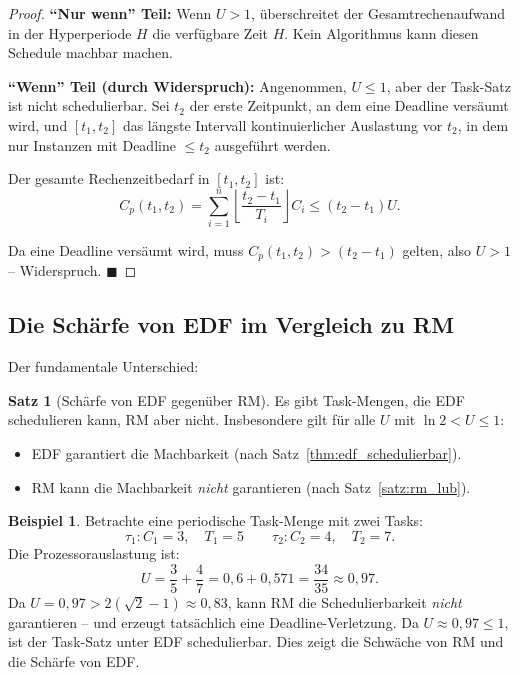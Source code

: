 ﻿\documentclass[a4paper,12pt]{report}
\theoremstyle{definition}
\newtheorem{beispiel}{Beispiel}[chapter]
\newtheorem{satz}{Satz}[chapter]
\begin{document}
\begin{proof}
	\textbf{``Nur wenn'' Teil:} Wenn $U > 1$, überschreitet der Gesamtrechenaufwand
	in der Hyperperiode $H$ die verfügbare Zeit $H$. Kein Algorithmus kann diesen
	Schedule machbar machen.

	\textbf{``Wenn'' Teil (durch Widerspruch):} Angenommen, $U \leq 1$, aber der
	Task-Satz ist nicht schedulierbar. Sei $t_2$ der erste Zeitpunkt, an dem eine
	Deadline versäumt wird, und $[t_1, t_2]$ das längste Intervall kontinuierlicher
	Auslastung vor $t_2$, in dem nur Instanzen mit Deadline $\leq t_2$ ausgeführt werden.

	Der gesamte Rechenzeitbedarf in $[t_1, t_2]$ ist:
	\[
		C_p(t_1, t_2) = \sum_{i=1}^{n} \left\lfloor \frac{t_2 - t_1}{T_i} \right\rfloor C_i \leq (t_2 - t_1) U.
	\]

	Da eine Deadline versäumt wird, muss $C_p(t_1, t_2) > (t_2 - t_1)$ gelten,
	also $U > 1$ -- Widerspruch. \hfill$\blacksquare$
\end{proof}

\subsection{Die Schärfe von EDF im Vergleich zu RM}

Der fundamentale Unterschied:

\begin{satz}[Schärfe von EDF gegenüber RM]
	\label{satz:edf_scharf}
	Es gibt Task-Mengen, die EDF schedulieren kann, RM aber nicht. Insbesondere gilt
	für alle $U$ mit $\ln 2 < U \leq 1$:
	\begin{itemize}
		\item EDF garantiert die Machbarkeit (nach Satz~\ref{thm:edf_schedulierbar}).
		\item RM kann die Machbarkeit \emph{nicht} garantieren (nach Satz~\ref{satz:rm_lub}).
	\end{itemize}
\end{satz}

\begin{beispiel}
	Betrachte eine periodische Task-Menge mit zwei Tasks:
	\[
		\tau_1: C_1 = 3, \quad T_1 = 5 \qquad \tau_2: C_2 = 4, \quad T_2 = 7.
	\]
	Die Prozessorauslastung ist:
	\[
		U = \frac{3}{5} + \frac{4}{7} = 0{,}6 + 0{,}571 = \frac{34}{35} \approx 0{,}97.
	\]
	Da $U = 0{,}97 > 2(\sqrt{2}-1) \approx 0{,}83$, kann RM die Schedulierbarkeit
	\emph{nicht} garantieren -- und erzeugt tatsächlich eine Deadline-Verletzung.
	Da $U \approx 0{,}97 \leq 1$, ist der Task-Satz unter EDF schedulierbar.
	Dies zeigt die Schwäche von RM und die Schärfe von EDF.
\end{beispiel}
\end{document}
